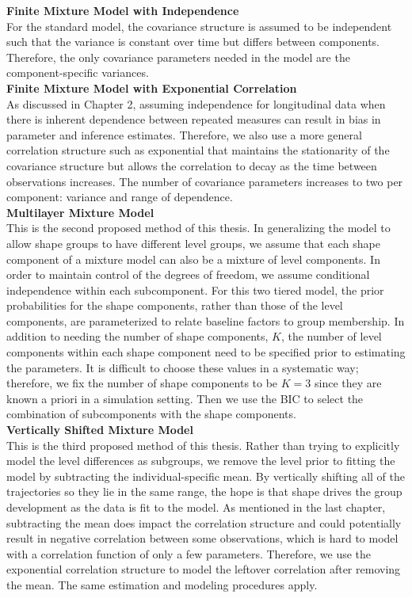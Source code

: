 \documentclass[12pt]{article}
\begin{document}
\textbf{Finite Mixture Model with Independence}\\
For the standard model, the covariance structure is assumed to be independent such that the variance is constant over time but differs between components. Therefore, the only covariance parameters needed in the model are the component-specific variances.\\

\textbf{Finite Mixture Model with Exponential Correlation}\\
As discussed in Chapter 2, assuming independence for longitudinal data when there is inherent dependence between repeated measures can result in bias in parameter and inference estimates. Therefore, we also use a more general correlation structure such as exponential that maintains the stationarity of the covariance structure but allows the correlation to decay as the time between observations increases. The number of covariance parameters increases to two per component: variance and range of dependence. \\

\textbf{Multilayer Mixture Model}\\
This is the second proposed method of this thesis. In generalizing the model to allow shape groups to have different level groups, we assume that each shape component of a mixture model can also be a mixture of level components. In order to maintain control of the degrees of freedom, we assume conditional independence within each subcomponent. For this two tiered model, the prior probabilities for the shape components, rather than those of the level components, are parameterized to relate baseline factors to group membership. In addition to needing the number of shape components, $K$, the number of level components within each shape component need to be specified prior to estimating the parameters. It is difficult to choose these values in a systematic way; therefore, we fix the number of shape components to be $K=3$ since they are known a priori in a simulation setting. Then we use the BIC to select the combination of subcomponents with the shape components. \\

\textbf{Vertically Shifted Mixture Model}\\
This is the third proposed method of this thesis. Rather than trying to explicitly model the level differences as subgroups, we remove the level prior to fitting the model by subtracting the individual-specific mean. By vertically shifting all of the trajectories so they lie in the same range, the hope is that shape drives the group development as the data is fit to the model. As mentioned in the last chapter, subtracting the mean does impact the correlation structure and could potentially result in negative correlation between some observations, which is hard to model with a correlation function of only a few parameters. Therefore, we use the exponential correlation structure to model the leftover correlation after removing the mean. The same estimation and modeling procedures apply.
\end{document}
